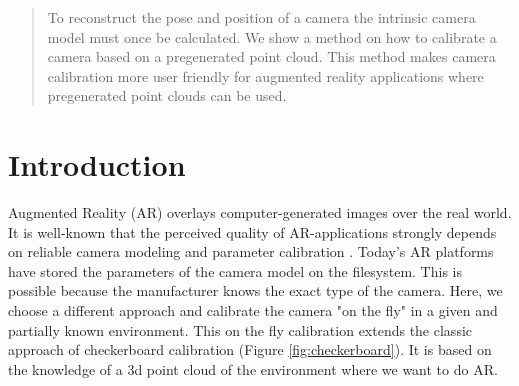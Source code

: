 \documentclass[conference,nofonttune]{IEEEtran}
\begin{document}
\begin{abstract}
  To reconstruct the pose and position of a camera the intrinsic camera model must once be calculated. We show a method on how to calibrate a camera based on a pregenerated point cloud. This method makes camera calibration more user friendly for augmented reality applications where pregenerated point clouds can be used.
\end{abstract}


%
\IEEEpeerreviewmaketitle

\section{Introduction}
Augmented Reality (AR) overlays computer-generated images over the real world. It is well-known that the perceived quality of AR-applications strongly depends on reliable camera modeling and parameter calibration \cite{Zaun}. Today’s AR platforms have stored the parameters of the camera model on the filesystem. This is possible because the manufacturer knows the exact type of the camera. Here, we choose a different approach and calibrate the camera "on the fly" in a given and partially known environment. This on the fly calibration extends the classic approach of checkerboard calibration \cite{Zhang} (Figure \ref{fig:checkerboard}). It is based on the knowledge of a 3d point cloud of the environment where we want to do AR.
\end{document}
